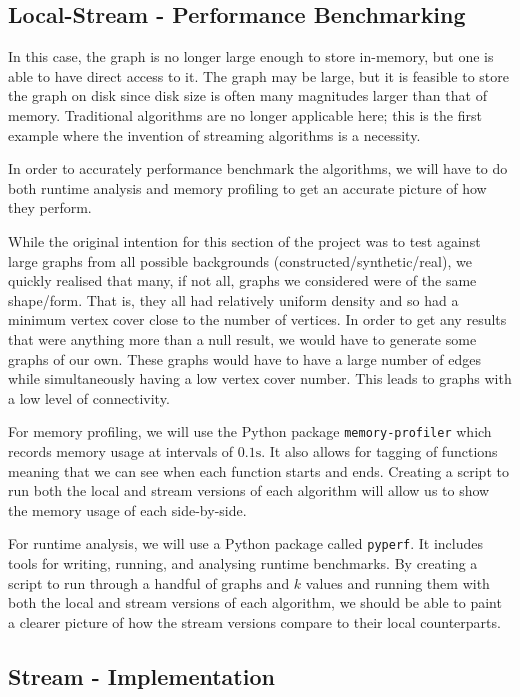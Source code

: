 \subsection{Local-Stream - Performance Benchmarking}

In this case, the graph is no longer large enough to store in-memory, but one
is able to have direct access to it. The graph may be large, but it is feasible
to store the graph on disk since disk size is often many magnitudes larger than
that of memory. Traditional algorithms are no longer applicable here; this is
the first example where the invention of streaming algorithms is a necessity.

In order to accurately performance benchmark the algorithms, we will have to do
both runtime analysis and memory profiling to get an accurate picture of how
they perform.

While the original intention for this section of the project was to test
against large graphs from all possible backgrounds
(constructed/synthetic/real), we quickly realised that many, if not all, graphs
we considered were of the same shape/form. That is, they all had relatively
uniform density and so had a minimum vertex cover close to the number of
vertices. In order to get any results that were anything more than a null
result, we would have to generate some graphs of our own. These graphs would
have to have a large number of edges while simultaneously having a low vertex
cover number. This leads to graphs with a low level of connectivity.

For memory profiling, we will use the Python package \texttt{memory-profiler}
which records memory usage at intervals of \(0.1\text{s}\). It also allows for
tagging of functions meaning that we can see when each function starts and
ends. Creating a script to run both the local and stream versions of each
algorithm will allow us to show the memory usage of each side-by-side.

For runtime analysis, we will use a Python package called \texttt{pyperf}. It
includes tools for writing, running, and analysing runtime benchmarks. By
creating a script to run through a handful of graphs and \(k\) values and
running them with both the local and stream versions of each algorithm, we
should be able to paint a clearer picture of how the stream versions compare to
their local counterparts.

\subsection{Stream - Implementation}

